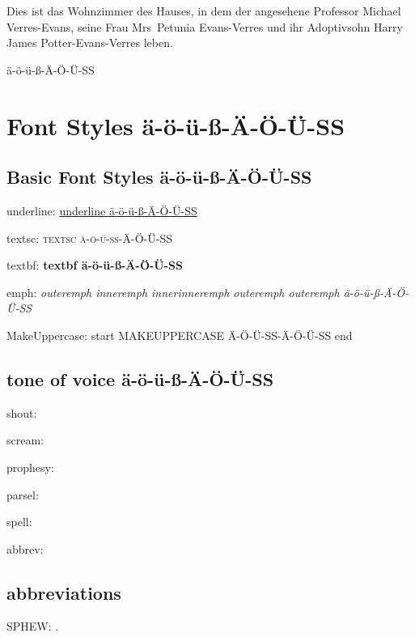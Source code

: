 Dies ist das Wohnzimmer des Hauses, in dem der angesehene Professor Michael Verres-Evans, seine Frau Mrs~Petunia Evans-Verres und ihr Adoptivsohn Harry James Potter-Evans-Verres leben.

ä-ö-ü-ß-Ä-Ö-Ü-SS

\chapter{Font Styles ä-ö-ü-ß-Ä-Ö-Ü-SS}

\section{Basic Font Styles ä-ö-ü-ß-Ä-Ö-Ü-SS}

underline: \underline{underline ä-ö-ü-ß-Ä-Ö-Ü-SS}

textsc: \textsc{textsc ä-ö-ü-ß-Ä-Ö-Ü-SS}

textbf: \textbf{textbf ä-ö-ü-ß-Ä-Ö-Ü-SS}

emph: \emph{outeremph \emph{inneremph \emph{innerinneremph} outeremph} outeremph ä-ö-ü-ß-Ä-Ö-Ü-SS}

MakeUppercase: start \MakeUppercase{MakeUppercase ä-ö-ü-ß-Ä-Ö-Ü-SS} end

\section{tone of voice ä-ö-ü-ß-Ä-Ö-Ü-SS}

shout: 

scream: 

prophesy: 

parsel: 

spell: 

abbrev: 

\section{abbreviations}
SPHEW: \SPHEW.


